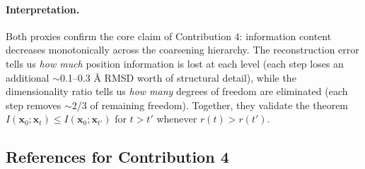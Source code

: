\documentclass[12pt,a4paper]{article}
\begin{document}
\paragraph{Interpretation.}
Both proxies confirm the core claim of Contribution 4: information content decreases monotonically across the coarsening hierarchy. The reconstruction error tells us \emph{how much} position information is lost at each level (each step loses an additional $\sim$0.1--0.3 \AA{} RMSD worth of structural detail), while the dimensionality ratio tells us \emph{how many} degrees of freedom are eliminated (each step removes $\sim$2/3 of remaining freedom). Together, they validate the theorem $I(\bm{x}_0; \bm{x}_t) \leq I(\bm{x}_0; \bm{x}_{t'})$ for $t > t'$ whenever $r(t) > r(t')$.


\subsection{References for Contribution 4}
\end{document}
